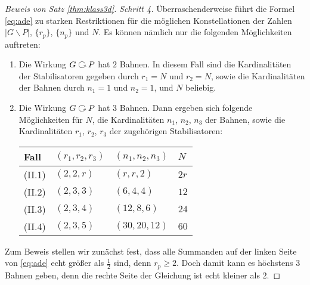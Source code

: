 \documentclass{book}
\begin{document}
\begin{proof}[Beweis von Satz \ref{thm:klass3d}]
    \noindent
    \emph{Schritt 4.} Überraschenderweise führt die Formel \eqref{eq:ade} zu
    starken Restriktionen für die möglichen Konstellationen der Zahlen $|G
    \backslash P|$, $\{r_p\}$, $\{n_p\}$ und $N$. Es können nämlich nur die folgenden Möglichkeiten auftreten:
    \begin{enumerate}[label=(\Roman *)]
        \item\label{so3:I} Die Wirkung $G \actson P$ hat $2$ Bahnen. In diesem Fall sind die
            Kardinalitäten der Stabilisatoren gegeben durch $r_1 = N$ und $r_2 = N$, sowie die
            Kardinalitäten der Bahnen durch $n_1 = 1$ und $n_2 = 1$, und $N$ beliebig. 
        \item\label{so3:II} Die Wirkung $G \actson P$ hat $3$ Bahnen. Dann ergeben sich 
            folgende Möglichkeiten für $N$, die Kardinalitäten $n_1$,
            $n_2$, $n_3$ der Bahnen, sowie die Kardinalitäten $r_1$, $r_2$, $r_3$ der
            zugehörigen Stabilisatoren:
            \begin{center}
            \begin{tabular}{l|l|l|l}
                Fall & $(r_1,r_2,r_3)$ & $(n_1,n_2,n_3)$ & $N$\\ \hline
                (II.1) & $(2,2,r )$ & $(r,r, 2)$ & $2r$\\
                (II.2) &  $(2,3,3)$ & $(6,4,4)$ & $12$\\
                (II.3) & $(2,3,4)$ & $(12,8,6)$ & $24$\\
                (II.4) & $(2,3,5)$ & $(30,20,12)$ & $60$
            \end{tabular}
        \end{center}
    \end{enumerate}

    Zum Beweis stellen wir zunächst fest, dass alle Summanden auf der linken
    Seite von \eqref{eq:ade} echt größer als $\frac{1}{2}$ sind, denn $r_p \ge
    2$. Doch damit kann es höchstens $3$ Bahnen geben, denn die rechte Seite
    der Gleichung ist echt kleiner als $2$. 


\end{proof}
\end{document}
